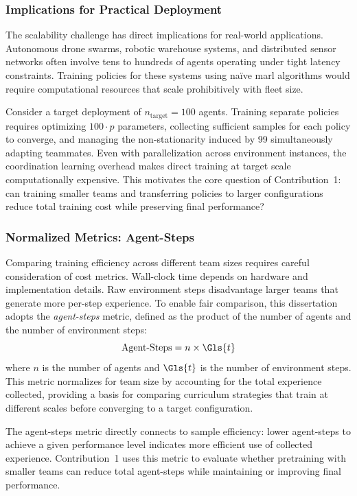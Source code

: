 \subsubsection{Implications for Practical Deployment}

The scalability challenge has direct implications for real-world applications. 
Autonomous drone swarms, robotic warehouse systems, and distributed sensor networks 
often involve tens to hundreds of agents operating under tight latency constraints. 
Training policies for these systems using na\"ive \gls{marl} algorithms would require 
computational resources that scale prohibitively with fleet size.

Consider a target deployment of \(n_{\text{target}} = 100\) agents. 
Training separate policies requires optimizing \(100 \cdot p\) parameters, 
collecting sufficient samples for each policy to converge, and managing 
the non-stationarity induced by 99 simultaneously adapting teammates. 
Even with parallelization across environment instances, the coordination 
learning overhead makes direct training at target scale computationally expensive. 
This motivates the core question of Contribution~1: can training smaller teams 
and transferring policies to larger configurations reduce total training cost 
while preserving final performance?

\subsubsection{Normalized Metrics: Agent-Steps}

Comparing training efficiency across different team sizes requires 
careful consideration of cost metrics. Wall-clock time depends on 
hardware and implementation details. Raw environment steps disadvantage 
larger teams that generate more per-step experience. 
To enable fair comparison, this dissertation adopts the \textit{agent-steps} metric, 
defined as the product of the number of agents and the number of environment steps:
\begin{equation}
    \text{Agent-Steps} = n \times \Gls{t}
    \label{eq:agent-steps}
\end{equation}
where \(n\) is the number of agents and \(\Gls{t}\) is the number of environment steps. 
This metric normalizes for team size by accounting for the total experience collected, 
providing a basis for comparing curriculum strategies that train at different 
scales before converging to a target configuration.

The agent-steps metric directly connects to sample efficiency: 
lower agent-steps to achieve a given performance level indicates 
more efficient use of collected experience. Contribution~1 uses 
this metric to evaluate whether pretraining with smaller teams can 
reduce total agent-steps while maintaining or improving final performance.

